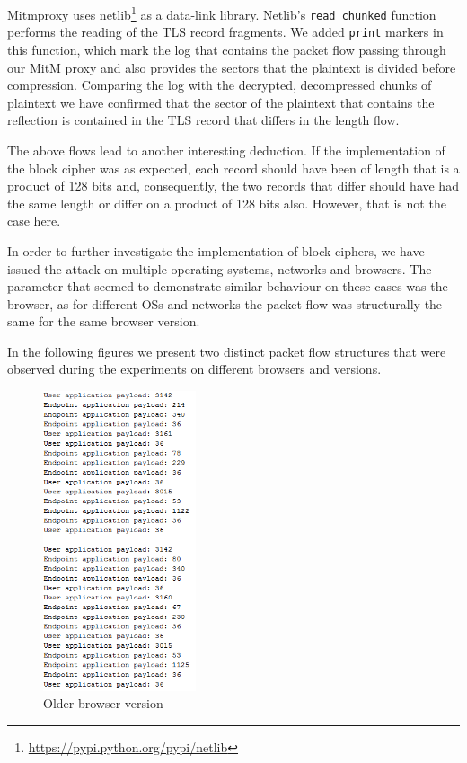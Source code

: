 Mitmproxy uses netlib\footnote{\url{https://pypi.python.org/pypi/netlib}} as a
data-link library. Netlib's \texttt{read\_chunked} function performs the reading
of the TLS record fragments. We added \texttt{print} markers in this function,
which mark the log that contains the packet flow passing through our MitM proxy
and also provides the sectors that the plaintext is divided before compression.
Comparing the log with the decrypted, decompressed chunks of plaintext we have
confirmed that the sector of the plaintext that contains the reflection is
contained in the TLS record that differs in the length flow.

The above flows lead to another interesting deduction. If the implementation of
the block cipher was as expected, each record should have been of length that is
a product of 128 bits and, consequently, the two records that differ should have
had the same length or differ on a product of 128 bits also.  However, that is
not the case here.

In order to further investigate the implementation of block ciphers, we have
issued the attack on multiple operating systems, networks and browsers. The
parameter that seemed to demonstrate similar behaviour on these cases was the
browser, as for different OSs and networks the packet flow was structurally the
same for the same browser version.

In the following figures we present two distinct packet flow structures that
were observed during the experiments on different browsers and versions.

\begin{figure}[H] \caption{Older browser version} \centering
\includegraphics[width=0.4\textwidth]{diagrams/older_browser_version.png}\end{figure}

